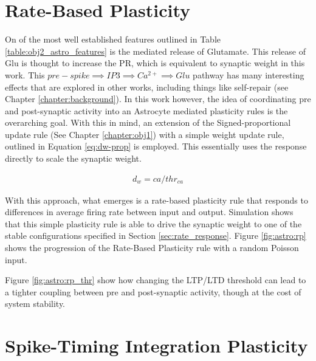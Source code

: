 \section{Rate-Based Plasticity}
On of the most well established features outlined in Table
\ref{table:obj2_astro_features} is the \ipt \ca mediated release of
Glutamate. This release of Glu is thought to increase the PR, which is
equivalent to synaptic weight in this work. This $pre-spike \implies IP3
\implies Ca^{2+} \implies Glu$ pathway has many interesting effects that are
explored in other works, including things like self-repair (see Chapter
\ref{chapter:background}). In this work however, the idea of coordinating pre
and post-synaptic activity into an Astrocyte mediated plasticity rules is the
overarching goal. With this in mind, an extension of the Signed-proportional
update rule (See Chapter \ref{chapter:obj1}) with a simple weight update rule,
outlined in Equation \ref{eq:dw-prop} is employed. This essentially uses the \ca
response directly to scale the synaptic weight.

\begin{align}
  d_w = ca / thr_{ca}  \label{eq:dw-prop}
\end{align}

With this approach, what emerges is a rate-based plasticity rule that responds
to differences in average firing rate between input and output. Simulation shows
that this simple plasticity rule is able to drive the synaptic weight to one of
the stable configurations specified in Section \ref{sec:rate_response}. Figure
\ref{fig:astro:rp} shows the progression of the Rate-Based Plasticity rule with a random
Poisson input.


Figure \ref{fig:astro:rp_thr} show how changing the LTP/LTD threshold can lead to a tighter
coupling between pre and post-synaptic activity, though at the cost of system
stability.


\section{Spike-Timing Integration Plasticity}

